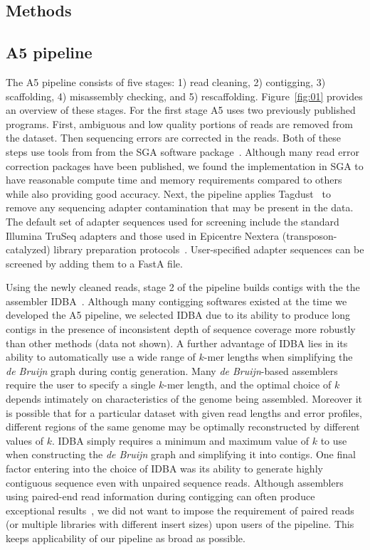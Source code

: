 \documentclass{bioinfo}
\begin{document}
\begin{methods}
\section{Methods}

\subsection{A5 pipeline}

The A5 pipeline consists of five stages: 1) read cleaning, 2) contigging, 3) scaffolding,
4) misassembly checking, and 5) rescaffolding. Figure~\ref{fig:01} provides an overview of these stages. 
For the first stage A5 uses two previously
published programs. First, ambiguous and low quality portions of reads are removed from the dataset. Then sequencing errors are corrected in the reads.
Both of these steps use tools from 
from the SGA software package~\citep{Simpson2010}.  Although many read error correction packages have been published,
we found the implementation in SGA to have reasonable compute time and memory requirements compared to others while also providing 
good accuracy.  Next, the pipeline applies Tagdust~\citep{Lassmann2009} to remove any 
sequencing adapter contamination that may be present in the data. The default set of adapter sequences used for screening
include the standard Illumina TruSeq adapters and those used in Epicentre Nextera (transposon-catalyzed) library preparation protocols~\citep{Adey2010}. 
User-specified adapter sequences can be screened by adding them to a FastA file. 

Using the newly cleaned reads, stage 2 of the pipeline builds contigs
with the the assembler IDBA~\citep{Peng2010}. Although many contigging softwares existed at the time we developed the A5 pipeline, we selected IDBA due 
to its ability to produce long contigs in the presence of inconsistent depth of sequence coverage more robustly than other methods (data not shown).
A further advantage of IDBA lies in its ability to automatically use a wide range of $k$-mer lengths when simplifying the \emph{de Bruijn} graph 
during contig generation.
Many \emph{de Bruijn}-based assemblers require the user to specify a single $k$-mer length, and the optimal choice of $k$ depends intimately
on characteristics of the genome being assembled.  Moreover it is possible that for a particular dataset with given read lengths and error profiles, 
different regions of the same genome may be optimally reconstructed by different values of $k$. IDBA simply requires a minimum and maximum value of
$k$ to use when constructing the \emph{de Bruijn} graph and simplifying it into contigs. One final factor entering into the choice of IDBA was its 
ability to generate highly contiguous sequence even with unpaired sequence reads. Although assemblers using paired-end read information during 
contigging can often produce exceptional results~\citep{Gnerre2011, SASSY}, we did not want to impose the requirement of paired reads (or multiple
libraries with different insert sizes) upon users of the pipeline. This keeps applicability of our pipeline as broad as possible.


\end{methods}
\end{document}
